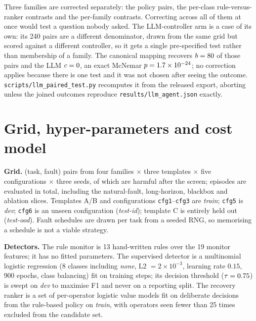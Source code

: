 Three families are corrected separately: the \HolmPolicyTests{} policy pairs, the
\HolmClassTests{} per-class rule-versus-ranker contrasts and the \HolmFamilyTests{}
per-family contrasts. Correcting across all of them at once would test a question nobody
asked. The LLM-controller arm is a case of its own: its 240 pairs are a different denominator,
drawn from the same grid but scored against a different controller, so it gets a single
pre-specified test rather than membership of a family. The canonical mapping recovers
$b=80$ of those pairs and the LLM $c=0$, an exact McNemar $p=1.7\times10^{-24}$;
no correction applies because there is one test and it was not chosen after seeing the outcome.
\texttt{scripts/llm\_paired\_test.py} recomputes it from the released export, aborting unless the
joined outcomes reproduce \texttt{results/llm\_agent.json} exactly.







\section{Grid, hyper-parameters and cost model}\label{app:grid}

\textbf{Grid.} \NumPairs{} (task, fault) pairs from four families $\times$ three templates
$\times$ five configurations $\times$ three seeds, of which \NumHarmful{} are harmful after
the screen; \NumEpisodes{} episodes are evaluated in total, including the natural-fault,
long-horizon, blackbox and ablation slices. Templates A/B and configurations
\texttt{cfg1}--\texttt{cfg3} are \emph{train}; \texttt{cfg5} is \emph{dev}; \texttt{cfg6} is an
unseen configuration (\emph{test-id}); template C is entirely held out (\emph{test-ood}).
Fault schedules are drawn per task from a seeded RNG, so memorising a schedule is not a
viable strategy.

\textbf{Detectors.} The rule monitor is 13 hand-written rules over the 19 monitor features; it
has no fitted parameters. The supervised detector is a multinomial logistic regression (8
classes including \emph{none}, L2 $=2\times10^{-3}$, learning rate $0.15$, 900 epochs, class
balancing) fit on \DetTrainRows{} training steps; its decision threshold ($\tau=0.75$)
is swept on \emph{dev} to maximise F1 and never on a reporting split. The recovery ranker is a
set of per-operator logistic value models fit on deliberate decisions from the rule-based
policy on \emph{train}, with operators seen fewer than 25 times excluded from the candidate set.

